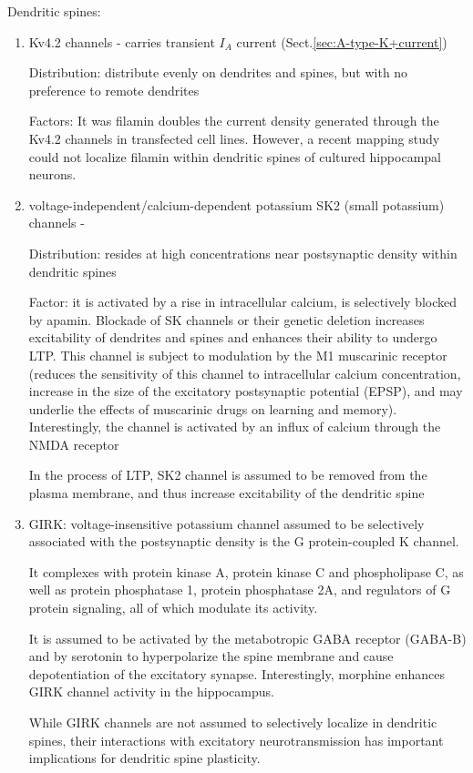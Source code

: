 Dendritic spines: \citep{sala2014}
\begin{enumerate}
  \item Kv4.2 channels - carries transient $I_A$ current (Sect.\ref{sec:A-type-K+current})
  
  Distribution: distribute evenly on dendrites and spines, but with no
  preference to remote dendrites

 Factors: It was filamin doubles the
current density generated through the Kv4.2 channels in transfected
cell lines. However, a recent mapping study could not
localize filamin within dendritic spines of cultured hippocampal
neurons.
 
  \item voltage-independent/calcium-dependent potassium SK2 (small potassium)
  channels - 
  
  Distribution: resides at high concentrations
near postsynaptic density within dendritic spines
  
  Factor: it is activated by a rise in intracellular calcium, is
selectively blocked by apamin. Blockade of SK channels or their genetic deletion
increases excitability of dendrites and spines and enhances their ability to
undergo LTP. This channel is subject to modulation by the M1 muscarinic receptor
(reduces the sensitivity of this channel to intracellular calcium concentration,
increase in the size of the excitatory postsynaptic potential (EPSP), and may
underlie the effects of muscarinic drugs on learning and memory). Interestingly,
the channel is activated by an influx of calcium through the NMDA receptor

In the process of LTP, SK2 channel is assumed to be removed
from the plasma membrane, and thus increase excitability of
the dendritic spine

   \item GIRK: voltage-insensitive potassium channel assumed to be
selectively associated with the postsynaptic density is the G
protein-coupled K channel.

It complexes with protein kinase A, protein kinase C and phospholipase C, as
well as protein phosphatase 1, protein phosphatase 2A, and regulators of G
protein signaling, all of which modulate its activity.

It is assumed to be activated by the metabotropic
GABA receptor (GABA-B) and by serotonin to hyperpolarize
the spine membrane and cause depotentiation of the excitatory
synapse. Interestingly, morphine enhances GIRK channel
activity in the hippocampus.

While GIRK channels are not assumed to selectively localize in dendritic spines,
their interactions with excitatory neurotransmission has important implications
for dendritic spine plasticity.
\end{enumerate}


